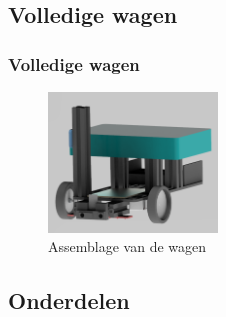 \documentclass
   [kulak,aspectratio=169,<options>] %
   {kulakbeamer}
\begin{document}
%	

\subsection{Volledige wagen}
\begin{frame}
	\frametitle{Volledige wagen}
	\begin{figure}
		\centering
		\includegraphics[width=0.4\textwidth]{4Volledig}
		\caption{Assemblage van de wagen}
	\end{figure}
\end{frame}

\subsection{Onderdelen}
\end{document}
